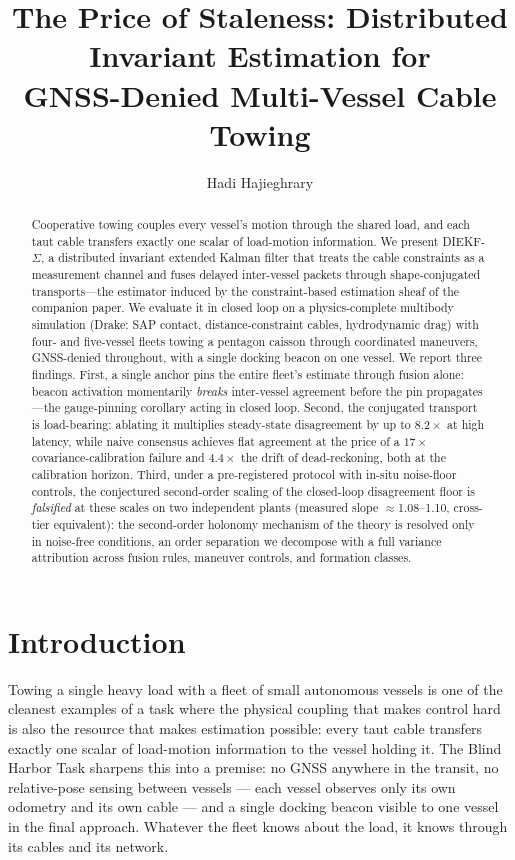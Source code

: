 \documentclass[letterpaper, 10pt, journal]{IEEEtran}
\title{The Price of Staleness: Distributed Invariant Estimation for\\
GNSS-Denied Multi-Vessel Cable Towing}
\author{Hadi Hajieghrary%
}
\begin{document}
\maketitle

\begin{abstract}
Cooperative towing couples every vessel's motion through the shared load, and
each taut cable transfers exactly one scalar of load-motion information. We
present DIEKF-$\Sigma$, a distributed invariant extended Kalman filter that
treats the cable constraints as a measurement channel and fuses delayed
inter-vessel packets through shape-conjugated transports---the estimator induced
by the constraint-based estimation sheaf of the companion paper. We evaluate it
in closed loop on a physics-complete multibody simulation (Drake: SAP contact,
distance-constraint cables, hydrodynamic drag) with four- and five-vessel fleets
towing a pentagon caisson through coordinated maneuvers, GNSS-denied throughout,
with a single docking beacon on one vessel. We report three findings. First, a
single anchor pins the entire fleet's estimate through fusion alone: beacon
activation momentarily \emph{breaks} inter-vessel agreement before the pin
propagates---the gauge-pinning corollary acting in closed loop. Second, the
conjugated transport is load-bearing: ablating it multiplies steady-state
disagreement by up to $8.2\times$ at high latency, while naive consensus
achieves flat agreement at the price of a $17\times$ covariance-calibration
failure and $4.4\times$ the drift of dead-reckoning, both at the calibration
horizon. Third, under a
pre-registered protocol with in-situ noise-floor controls, the conjectured
second-order scaling of the closed-loop disagreement floor is \emph{falsified}
at these scales on two independent plants (measured slope $\approx$1.08--1.10,
cross-tier equivalent): the second-order holonomy mechanism of the theory is
resolved only in noise-free conditions, an order separation we decompose with a
full variance attribution across fusion rules, maneuver controls, and formation
classes.
\end{abstract}

\section{Introduction}
Towing a single heavy load with a fleet of small autonomous vessels is one of
the cleanest examples of a task where the physical coupling that makes control
hard is also the resource that makes estimation possible: every taut cable
transfers exactly one scalar of load-motion information to the vessel holding
it. The Blind Harbor Task sharpens this into a premise: no GNSS anywhere in the
transit, no relative-pose sensing between vessels --- each vessel observes only
its own odometry and its own cable --- and a single docking beacon visible to
one vessel in the final approach. Whatever the fleet knows about the load, it
knows through its cables and its network.
\end{document}
